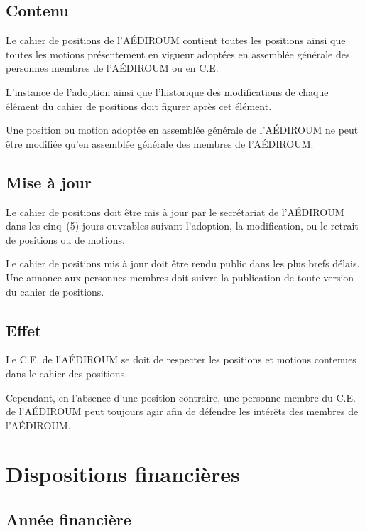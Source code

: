 \documentclass{aediroum}
\begin{document}
\subsection{Contenu}\label{sec:contenu-positions}

Le cahier de positions de l'AÉDIROUM contient toutes les positions ainsi que toutes les motions présentement en vigueur adoptées en assemblée générale des personnes membres de l'AÉDIROUM ou en C.E.

L'instance de l'adoption ainsi que l'historique des modifications de chaque élément du cahier de positions doit figurer après cet élément.

Une position ou motion adoptée en assemblée générale de l'AÉDIROUM ne peut être modifiée qu'en assemblée générale des membres de l'AÉDIROUM.

\subsection{Mise à jour}\label{sec:mise-a-jour-positions}

Le cahier de positions doit être mis à jour par le secrétariat de l'AÉDIROUM dans les cinq~(5) jours ouvrables suivant l'adoption, la modification, ou le retrait de positions ou de motions.

Le cahier de positions mis à jour doit être rendu public dans les plus brefs délais. Une annonce aux personnes membres doit suivre la publication de toute version du cahier de positions.

\subsection{Effet}\label{sec:effet-positions}

Le C.E. de l'AÉDIROUM se doit de respecter les positions et motions contenues dans le cahier des positions.

Cependant, en l'absence d'une position contraire, une personne membre du C.E. de l'AÉDIROUM peut toujours agir afin de défendre les intérêts des membres de l'AÉDIROUM.

\section{Dispositions financières}\label{sec:dispositions-financieres}
\subsection{Année financière}\label{sec:annee-financiere}
\end{document}
